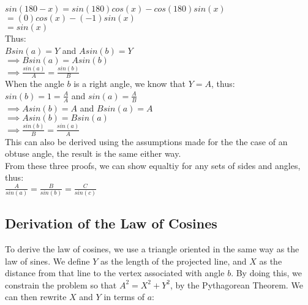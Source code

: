 \tab $sin(180-x) = sin(180)cos(x) - cos(180)sin(x)$\\

\tab $= (0)cos(x) - (-1)sin(x)$\\

\tab $= sin(x)$\\

Thus:\\

\tab $B sin(a) = Y$  and $A sin(b) = Y$ \\

\tab $\implies B sin(a) = A sin(b)$\\

\tab $\implies \frac{sin(a)}{A} = \frac{sin(b)}{B}$\\

When the angle $b$ is a right angle, we know that $Y = A$, thus:\\

\tab $sin(b) = 1 = \frac{A}{A}$ and $sin(a) = \frac{A}{B}$\\

\tab $\implies A sin(b) = A$ and $B sin(a) = A$\\

\tab $\implies A sin(b) = B sin(a)$\\

\tab $\implies \frac{sin(b)}{B} = \frac{sin(a)}{A}$\\

This can also be derived using the assumptions made for the the case of an obtuse angle, the result is the same either way.\\

From these three proofs, we can show equaltiy for any sets of sides and angles, thus:\\

\tab$\frac{A}{sin(a)} = \frac{B}{sin(b)} = \frac{C}{sin(c)}$\\


\clearpage
\subsection{Derivation of the Law of Cosines}

To derive the law of cosines, we use a triangle oriented in the same way as the law of sines.  We define $Y$ as the length of the projected line, and $X$ as the distance from that line to the vertex associated with angle $b$.  By doing this, we constrain the problem so that $A^2 = X^2 + Y^2$, by the Pythagorean Theorem.  We can then rewrite $X$ and $Y$ in terms of $a$:\\

